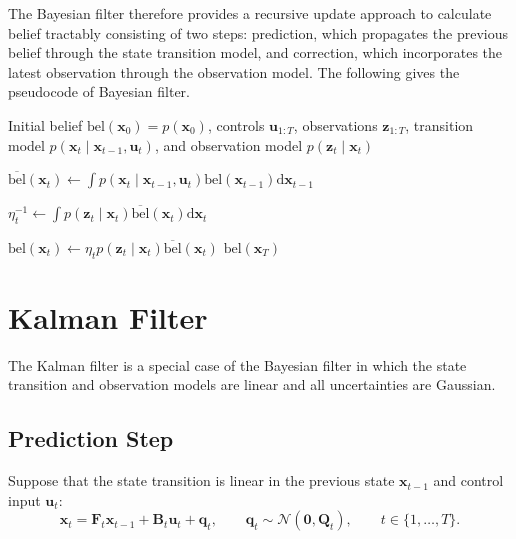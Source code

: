 \documentclass[../Bayesian_Inference.tex]{subfiles}
\begin{document}
The Bayesian filter therefore provides a recursive update approach to calculate belief tractably consisting of two steps: prediction, which propagates the previous belief through the state transition model, and correction, which incorporates the latest observation through the observation model. The following gives the pseudocode of Bayesian filter.

\begin{algorithm}[H]
    \caption{Bayesian Filter}
    \label{alg:bayesian-filter}
    \begin{algorithmic}[1]

    \Require Initial belief $\mathrm{bel}(\bm{x}_0)=p(\bm{x}_0)$, controls $\bm{u}_{1:T}$, observations $\bm{z}_{1:T}$, transition model $p(\bm{x}_t\mid\bm{x}_{t-1},\bm{u}_t)$, and observation model $p(\bm{z}_t\mid\bm{x}_t)$ 

        \State 
        $ \overline{\mathrm{bel}}(\bm{x}_t) \gets\displaystyle\int p(\bm{x}_t\mid\bm{x}_{t-1},\bm{u}_t) \mathrm{bel}(\bm{x}_{t-1}) \mathrm{d}\bm{x}_{t-1} $

        \State 
        $ \eta_t^{-1} \gets  \int p(\bm{z}_t\mid\bm{x}_t) \overline{\mathrm{bel}}(\bm{x}_t) \mathrm{d}\bm{x}_t $ 

        \State 
        $ \mathrm{bel}(\bm{x}_t) \gets \eta_t p(\bm{z}_t\mid\bm{x}_t) \overline{\mathrm{bel}}(\bm{x}_t) $ 
    \EndFor
    \State \Return $\mathrm{bel}(\bm{x}_T)$
    \end{algorithmic}
\end{algorithm}

\section{Kalman Filter}

The Kalman filter is a special case of the Bayesian filter in which the state transition and observation models are linear and all uncertainties are Gaussian.

\subsection{Prediction Step}

Suppose that the state transition is linear in the previous state $\bm{x}_{t-1}$ and control input $\bm{u}_t$:
\[
    \bm{x}_t = \mathbf{F}_{t}\bm{x}_{t-1} + \mathbf{B}_{t}\bm{u}_{t} + \bm{q}_t,
    \qquad
    \bm{q}_t \sim \mathcal{N}(\bm{0},\mathbf{Q}_t),
    \qquad
    t\in\{1,\dots,T\}.
\]
\end{document}
